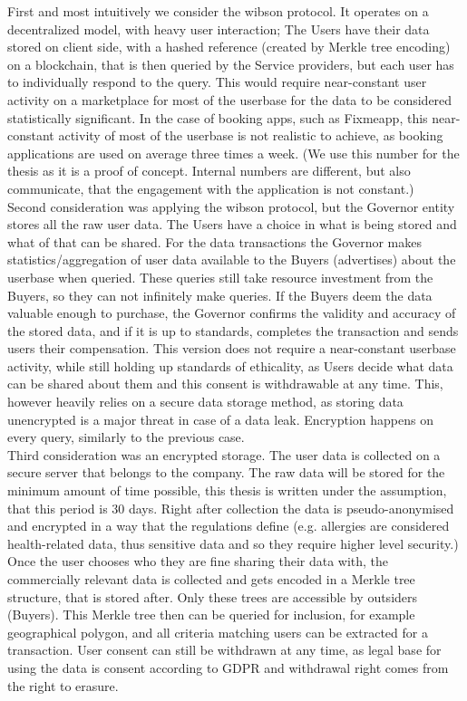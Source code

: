 \documentclass[english, 12pt, a4paper, sci, utf8, a-2b, online]{aaltothesis}
\theoremstyle{change}
\theoremstyle{theoremstyle}
\begin{document}
First and most intuitively we consider the wibson protocol. It operates on a decentralized model, with heavy user interaction; The Users have their data stored on client side, with a hashed reference (created by Merkle tree encoding) on a blockchain, that is then queried by the Service providers, but each user has to individually respond to the query. This would require near-constant user activity on a marketplace for most of the userbase for the data to be considered statistically significant. In the case of booking apps, such as Fixmeapp, this near-constant activity of most of the userbase is not realistic to achieve, as booking applications are used on average three times a week. (We use this number for the thesis as it is a proof of concept. Internal numbers are different, but also communicate, that the engagement with the application is not constant.)\\
Second consideration was applying the wibson protocol, but the Governor entity stores all the raw user data. The Users have a choice in what is being stored and what of that can be shared. For the data transactions the Governor makes statistics/aggregation of user data available to the Buyers (advertises) about the userbase when queried. These queries still take resource investment from the Buyers, so they can not infinitely make queries. If the Buyers deem the data valuable enough to purchase, the Governor confirms the validity and accuracy of the stored data, and if it is up to standards, completes the transaction and sends users their compensation. This version does not require a near-constant userbase activity, while still holding up standards of ethicality, as Users decide what data can be shared about them and this consent is withdrawable at any time. This, however heavily relies on a secure data storage method, as storing data unencrypted is a major threat in case of a data leak. Encryption happens on every query, similarly to the previous case.\\
Third consideration was an encrypted storage. The user data is collected on a secure server that belongs to the company. The raw data will be stored for the minimum amount of time possible, this thesis is written under the assumption, that this period is 30 days. Right after collection the data is pseudo-anonymised and encrypted in a way that the regulations define (e.g. allergies are considered health-related data, thus sensitive data and so they require higher level security.) Once the user chooses who they are fine sharing their data with, the commercially relevant data is collected and gets encoded in a Merkle tree structure, that is stored after. Only these trees are accessible by outsiders (Buyers). This Merkle tree then can be queried for inclusion, for example geographical polygon, and all criteria matching users can be extracted for a transaction. User consent can still be withdrawn at any time, as legal base for using the data is consent according to GDPR \cite{GDPR2016} and withdrawal right comes from the right to erasure.\\
\end{document}
